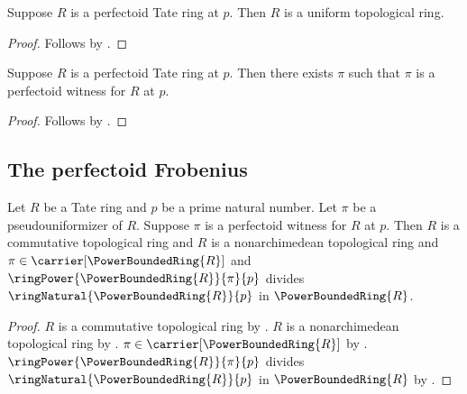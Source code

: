 \begin{proposition}\label{perfectoid_tate_ring_is_uniform}
    Suppose $R$ is a perfectoid Tate ring at $p$.
    Then $R$ is a uniform topological ring.
\end{proposition}
\begin{proof}
    Follows by .
\end{proof}

\begin{proposition}\label{perfectoid_tate_ring_has_witness}
    Suppose $R$ is a perfectoid Tate ring at $p$.
    Then there exists $\pi$ such that
        $\pi$ is a perfectoid witness for $R$ at $p$.
\end{proposition}
\begin{proof}
    Follows by .
\end{proof}

\subsection{The perfectoid Frobenius}

\begin{proposition}\label{perfectoid_witness_frobenius_context}
    Let $R$ be a Tate ring and $p$ be a prime natural number.
    Let $\pi$ be a pseudouniformizer of $R$.
    Suppose $\pi$ is a perfectoid witness for $R$ at $p$.
    Then $R$ is a commutative topological ring and
        $R$ is a nonarchimedean topological ring and
        $\pi\in\carrier[\PowerBoundedRing{R}]$ and
        $\ringPower{\PowerBoundedRing{R}}{\pi}{p}$ divides
            $\ringNatural{\PowerBoundedRing{R}}{p}$ in
            $\PowerBoundedRing{R}$.
\end{proposition}
\begin{proof}
    $R$ is a commutative topological ring by
        .
    $R$ is a nonarchimedean topological ring by
        .
    $\pi\in\carrier[\PowerBoundedRing{R}]$ by
        .
    $\ringPower{\PowerBoundedRing{R}}{\pi}{p}$ divides
        $\ringNatural{\PowerBoundedRing{R}}{p}$ in
        $\PowerBoundedRing{R}$ by
        .
\end{proof}

